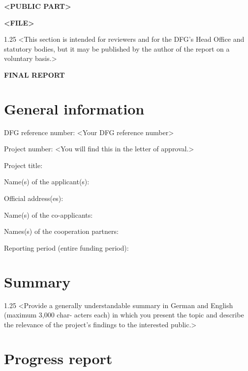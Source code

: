 \documentclass[a4paper, 11pt]{article}
\newcommand{\heading}[1]{{\Large\textbf{#1}\par\bigskip}}
\newenvironment{commentblock}{\begin{spacing}{1.25}\color{CommentColor}}{\end{spacing}\bigskip}
\newcommand{\comment}[1]{{\color{CommentColor}#1}}
\newcommand{\largecomment}[1]{{\Large\textbf{\comment{#1}}}}
\newcommand{\tg}{\textgreater}
\newcommand{\tl}{\textless}
\begin{document}
\largecomment{\tl{}PUBLIC PART\tg}

\largecomment{\tl{}FILE\tg}

\begin{commentblock}
\tl{}This section is intended for reviewers and for the DFG's Head Office and statutory bodies,
but it may be published by the author of the report on a voluntary basis.\tg
\end{commentblock}


\heading{FINAL REPORT}


\section{General information}

DFG reference number: \comment{\tl{}Your DFG reference number\tg}

Project number: \comment{\tl{}You will find this in the letter of approval.\tg}

Project title:

Name(s) of the applicant(s):

Official address(es):

Name(s) of the co-applicants:

Names(s) of the cooperation partners:

Reporting period (entire funding period):

\newpage


\section{Summary}

\begin{commentblock}
\tl{}Provide a generally understandable summary in German and English (maximum 3,000 char-
acters each) in which you present the topic and describe the relevance of the project’s findings
to the interested public.\tg
\end{commentblock}


\section{Progress report}
\end{document}
